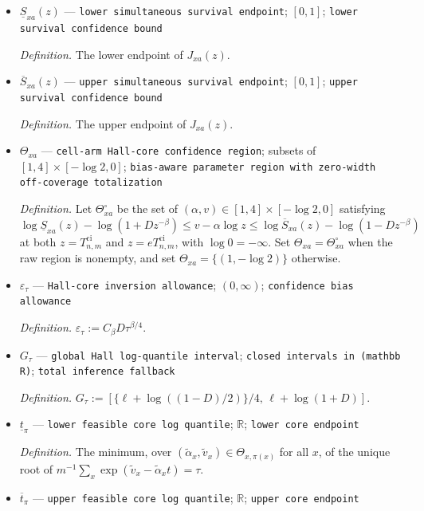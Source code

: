 \documentclass{article}
\begin{document}
\begin{itemize}
  \item \(\underline S_{xa}(z)\) --- \texttt{lower simultaneous survival endpoint}; \([0,1]\); \texttt{lower survival confidence bound}
  \par\smallskip\noindent\emph{Definition.} The lower endpoint of \(J_{xa}(z)\).
  \item \(\overline S_{xa}(z)\) --- \texttt{upper simultaneous survival endpoint}; \([0,1]\); \texttt{upper survival confidence bound}
  \par\smallskip\noindent\emph{Definition.} The upper endpoint of \(J_{xa}(z)\).
  \item \(\Theta_{xa}\) --- \texttt{cell-\allowbreak{}arm Hall-\allowbreak{}core confidence region}; subsets of \( [1,4]\times[-\log2,0] \); \texttt{bias-\allowbreak{}aware parameter region with zero-\allowbreak{}width off-\allowbreak{}coverage totalization}
  \par\smallskip\noindent\emph{Definition.} Let \(\Theta^\circ_{xa}\) be the set of \((\alpha,v)\in[1,4]\times[-\log2,0]\) satisfying \(\log\underline S_{xa}(z)-\log(1+Dz^{-\beta})\le v-\alpha\log z\le\log\overline S_{xa}(z)-\log(1-Dz^{-\beta})\) at both \(z=T^{\mathrm{ci}}_{n,m}\) and \(z=eT^{\mathrm{ci}}_{n,m}\), with \(\log0=-\infty\). Set \(\Theta_{xa}=\Theta^\circ_{xa}\) when the raw region is nonempty, and set \(\Theta_{xa}=\{(1,-\log2)\}\) otherwise.
  \item \(\varepsilon_{\tau}\) --- \texttt{Hall-\allowbreak{}core inversion allowance}; \((0,\infty)\); \texttt{confidence bias allowance}
  \par\smallskip\noindent\emph{Definition.} \(\varepsilon_{\tau}:=C_{\beta}D\tau^{\beta/4}\).
  \item \(G_{\tau}\) --- \texttt{global Hall log-\allowbreak{}quantile interval}; \texttt{closed intervals in (mathbb R)}; \texttt{total inference fallback}
  \par\smallskip\noindent\emph{Definition.} \(G_{\tau}:=[\{\ell+\log((1-D)/2)\}/4,\,\ell+\log(1+D)]\).
  \item \(\underline t_{\pi}\) --- \texttt{lower feasible core log quantile}; \(\mathbb R\); \texttt{lower core endpoint}
  \par\smallskip\noindent\emph{Definition.} The minimum, over \((\widetilde\alpha_x,\widetilde v_x)\in\Theta_{x,\pi(x)}\) for all \(x\), of the unique root of \(m^{-1}\sum_x\exp(\widetilde v_x-\widetilde\alpha_xt)=\tau\).
  \item \(\overline t_{\pi}\) --- \texttt{upper feasible core log quantile}; \(\mathbb R\); \texttt{upper core endpoint}

\end{itemize}
\end{document}
